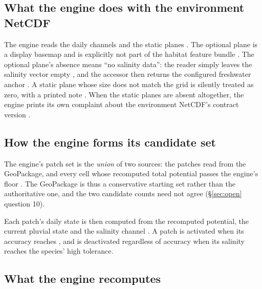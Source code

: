 \documentclass[11pt,a4paper]{article} \usepackage[utf8]{inputenc} \usepackage{lmodern} \usepackage[T1]{fontenc}
\begin{document}
\subsection{What the engine does with the environment NetCDF}

The engine reads the  daily channels and the
 static planes
. The optional 
plane is a display basemap and is explicitly not part of the habitat feature bundle
. The optional 
plane's absence means ``no salinity data'': the reader simply leaves the salinity vector empty
, and the accessor then returns
the configured freshwater anchor 
. A static plane
whose size does not match the grid is silently treated as zero, with a printed note
. When the static planes are absent
altogether, the engine prints its own complaint about the environment NetCDF's contract version
.

\subsection{How the engine forms its candidate set}

The engine's patch set is the \emph{union} of two sources: the patches read from the GeoPackage,
and every cell whose recomputed total potential passes the engine's floor
. The GeoPackage is thus a
conservative starting set rather than the authoritative one, and the two candidate counts need
not agree (\S\ref{sec:open} question 10).

Each patch's daily state is then computed from the recomputed potential, the current pluvial
state and the salinity channel . A
patch is activated when its accuracy reaches , and is
deactivated regardless of accuracy when its salinity reaches the species' high tolerance.

\subsection{What the engine recomputes}
\end{document}
